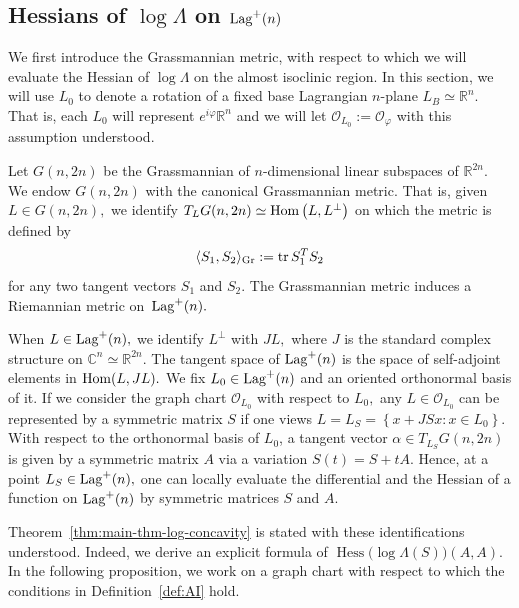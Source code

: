 \documentclass[11pt]{amsart}
\numberwithin{equation}{section}
\theoremstyle{definition}
\theoremstyle{definition}
\newcommand{\pair}[1]{\langle #1\rangle}
\newcommand{\set}[1]{\left\{#1\right\}}
\newcommand{\pr}[1]{\left(#1\right)}
\newcommand{\bb}[1]{\mathbb{#1}} \newcommand{\td}[1]{\widetilde{#1}}
\newcommand{\tr}{\text{tr}}
\begin{document}
\subsection{Hessians of $\log\Lambda$ on ${\rm Lag}^+(n)$}

We first introduce the Grassmannian metric, with respect to which we will evaluate the Hessian of $\log \Lambda$ on the almost isoclinic region.
In this section, we will use $L_0$ to denote a rotation of a fixed base Lagrangian $n$-plane $L_B\simeq\bb R^n.$
That is, each $L_0$ will represent $e^{i\varphi}\bb R^n$ and we will let $\mathcal O_{L_0}:=\mathcal O_\varphi$ with this assumption understood.


Let $G(n,2n)$ be the Grassmannian of $n$-dimensional linear subspaces of $\bb R^{2n}.$
We endow $G(n,2n)$ with the canonical Grassmannian metric.
That is, given $L\in G(n,2n),$ we identify 
$T_LG(n,2n)\simeq {\rm Hom}\pr{L,L^\perp}$
on which the metric is defined by
\begin{align}\label{Gr-metric}
\pair{S_1,S_2}_{\rm Gr}
:=\tr\, S_1^TS_2
\end{align}
for any two tangent vectors $S_1$ and $S_2.$
The Grassmannian metric induces a Riemannian metric on~${\rm Lag}^+(n).$


When $L\in{\rm Lag}^+(n),$ we identify $L^\perp$ with $JL,$ where $J$ is the standard complex structure on $\bb C^n\simeq\bb R^{2n}.$
The tangent space of ${\rm Lag}^+(n)$ is the space of self-adjoint elements in ${\rm Hom}(L,JL).$
We fix $L_0\in {\rm Lag}^+(n)$ and an oriented orthonormal basis of it. 
If we consider the graph chart $\mathcal O_{L_0}$ with respect to $L_0,$ any $L\in\mathcal O_{L_0}$ can be represented by a symmetric matrix $S$ if one views $L=L_S=\set{x+JSx: x\in L_0}.$
With respect to the orthonormal basis of $L_0$, a tangent vector $\alpha\in T_{L_S}G(n,2n)$ is given by a symmetric matrix $A$ via a variation $S(t)=S+tA.$
Hence, at a point $L_S\in{\rm Lag}^+(n),$ one can locally evaluate the differential and the Hessian of a function on ${\rm Lag}^+(n)$ by symmetric matrices $S$ and $A.$

Theorem~\ref{thm:main-thm-log-concavity} is stated with these identifications understood.
Indeed, we derive an explicit formula of $\operatorname{Hess}\big(\log \Lambda(S)\big)(A, A).$  
In the following proposition, we work on a graph chart with respect to which the conditions in Definition~\ref{def:AI} hold. 
\end{document}
